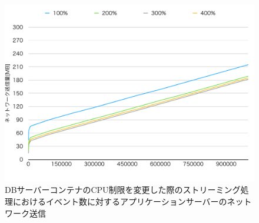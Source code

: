 \documentclass[../../../../../main]{subfiles}
\begin{document}
    \begin{figure}[H]
        \centering
        \includegraphics[width=12cm]{graph}
        \caption{DBサーバーコンテナのCPU制限を変更した際のストリーミング処理におけるイベント数に対するアプリケーションサーバーのネットワーク送信}
        \label{fig:stream-change-db-cpu-limit-app-net-out-app_4_8192-db_1024}
    \end{figure}
\end{document}
